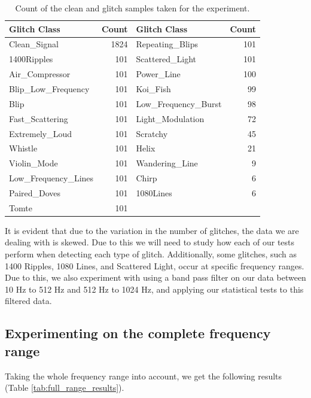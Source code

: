 \documentclass[12pt]{article}
\begin{document}
\begin{table}[H]
  \centering
  \begin{tabular}{lr|lr}
    \toprule
    Glitch Class & Count & Glitch Class & Count \\
    \midrule
    Clean\_Signal & 1824 & Repeating\_Blips & 101 \\
    1400Ripples & 101 & Scattered\_Light & 101 \\
    Air\_Compressor & 101 & Power\_Line & 100 \\
    Blip\_Low\_Frequency & 101 & Koi\_Fish & 99 \\
    Blip & 101 & Low\_Frequency\_Burst & 98 \\
    Fast\_Scattering & 101 & Light\_Modulation & 72 \\
    Extremely\_Loud & 101 & Scratchy & 45 \\
    Whistle & 101 & Helix & 21 \\
    Violin\_Mode & 101 & Wandering\_Line & 9 \\
    Low\_Frequency\_Lines & 101 & Chirp & 6 \\
    Paired\_Doves & 101 & 1080Lines & 6 \\
    Tomte & 101 \\
    \bottomrule
  \end{tabular}
  \caption{Count of the clean and glitch samples taken for the experiment.}
  \label{tab:label_counts}
\end{table}

\noindent It is evident that due to the variation in the number of glitches, the data we are dealing with is skewed. Due to this we will need to study how each of our tests perform when detecting each type of glitch. Additionally, some glitches, such as 1400 Ripples, 1080 Lines, and Scattered Light, occur at specific frequency ranges. Due to this, we also experiment with using a band pass filter on our data between 10 Hz to 512 Hz and 512 Hz to 1024 Hz, and applying our statistical tests to this filtered data.

\pagebreak

\subsection{Experimenting on the complete frequency range}\label{Experiment_1}

Taking the whole frequency range into account, we get the following results (Table \ref{tab:full_range_results}).
\end{document}
